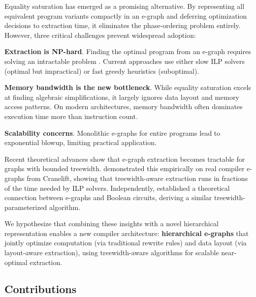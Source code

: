\documentclass[11pt]{article}
\begin{document}
Equality saturation \citep{tate2009equality} has emerged as a promising alternative. By representing all equivalent program variants compactly in an e-graph and deferring optimization decisions to extraction time, it eliminates the phase-ordering problem entirely. However, three critical challenges prevent widespread adoption:

\textbf{Extraction is NP-hard}. Finding the optimal program from an e-graph requires solving an intractable problem \citep{zhang2023np}. Current approaches use either slow ILP solvers (optimal but impractical) or fast greedy heuristics (suboptimal).

\textbf{Memory bandwidth is the new bottleneck}. While equality saturation excels at finding algebraic simplifications, it largely ignores data layout and memory access patterns. On modern architectures, memory bandwidth often dominates execution time more than instruction count.

\textbf{Scalability concerns}. Monolithic e-graphs for entire programs lead to exponential blowup, limiting practical application.

Recent theoretical advances show that e-graph extraction becomes tractable for graphs with bounded treewidth. \citet{goharshady2024fast} demonstrated this empirically on real compiler e-graphs from Cranelift, showing that treewidth-aware extraction runs in fractions of the time needed by ILP solvers. Independently, \citet{sun2024egraphs} established a theoretical connection between e-graphs and Boolean circuits, deriving a similar treewidth-parameterized algorithm.

We hypothesize that combining these insights with a novel hierarchical representation enables a new compiler architecture: \textbf{hierarchical e-graphs} that jointly optimize computation (via traditional rewrite rules) and data layout (via layout-aware extraction), using treewidth-aware algorithms for scalable near-optimal extraction.

\subsection{Contributions}
\end{document}
